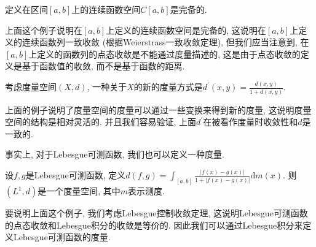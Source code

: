 \documentclass[theorem=false,mathfont=none,openany,sub3section]{easybook}
\begin{document}
\begin{example}
  定义在区间$[a,b]$上的连续函数空间$C[a,b]$是完备的.\par
\end{example}

\begin{remark}
  上面这个例子说明在$[a,b]$上定义的连续函数空间是完备的, 这说明在$[a,b]$上定义的连续函数列一致收敛 (根据Weierstrass一致收敛定理), 但我们应当注意到, 在$[a,b]$上定义的函数列的点态收敛是不能通过度量描述的, 这是由于点态收敛的定义是基于函数值的收敛, 而不是基于函数的距离.\par
\end{remark}

\begin{example}
  考虑度量空间$(X,d)$, 一种关于$X$的新的度量方式是$d^{\prime}(x,y)=\frac{d(x,y)}{1+d(x,y)}$.\par
\end{example}

\begin{remark}
  上面的例子说明了度量空间的度量可以通过一些变换来得到新的度量, 这说明度量空间的结构是相对灵活的. 并且我们容易验证, 上面$d^{\prime}$在被看作度量时收敛性和$d$是一致的.\par
\end{remark}

事实上, 对于Lebesgue可测函数, 我们也可以定义一种度量.\par

\begin{example}
  设$f,g$是Lebesgue可测函数, 定义$d(f,g) = \int_{[a,b]}^{} \frac{|f(x) - g(x)|}{1+|f(x) - g(x)|} \mathrm{d}m(x)$. 则$(L^1, d)$是一个度量空间, 其中$m$表示测度.\par
\end{example}

\begin{remark}
  要说明上面这个例子, 我们考虑Lebesgue控制收敛定理, 这说明Lebesgue可测函数的点态收敛和Lebesgue积分的收敛是等价的. 因此我们可以通过Lebesgue积分来定义Lebesgue可测函数的度量.\par
\end{remark}





\backmatter
\end{document}
